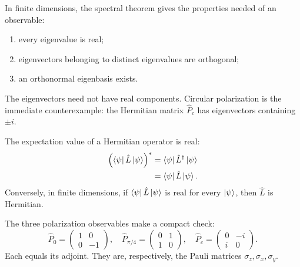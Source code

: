 In finite dimensions, the spectral theorem gives the properties needed of
an observable:
\begin{enumerate}
  \item every eigenvalue is real;
  \item eigenvectors belonging to distinct eigenvalues are orthogonal;
  \item an orthonormal eigenbasis exists.
\end{enumerate}
The eigenvectors need not have real components. Circular polarization is the
immediate counterexample: the Hermitian matrix \(\hat P_c\) has eigenvectors
containing \(\pm i\).

The expectation value of a Hermitian operator is real:
\begin{align}
  \left(
    \left\langle\psi\right\rvert\hat L\left\lvert\psi\right\rangle
  \right)^*
  &=
  \left\langle\psi\right\rvert\hat L^\dagger\left\lvert\psi\right\rangle\\
  &=
  \left\langle\psi\right\rvert\hat L\left\lvert\psi\right\rangle.
\end{align}
Conversely, in finite dimensions, if
\(\left\langle\psi\right\rvert\hat L\left\lvert\psi\right\rangle\) is real for every \(\left\lvert\psi\right\rangle\), then
\(\hat L\) is Hermitian.

\begin{classroomqa}
\end{classroomqa}

The three polarization observables make a compact check:
\begin{equation}
  \hat P_0=
  \begin{pmatrix}1&0\\0&-1\end{pmatrix},
  \quad
  \hat P_{\pi/4}=
  \begin{pmatrix}0&1\\1&0\end{pmatrix},
  \quad
  \hat P_c=
  \begin{pmatrix}0&-i\\i&0\end{pmatrix}.
  \label{eq:l7-three-Pauli}
\end{equation}
Each equals its adjoint. They are, respectively, the Pauli matrices
\(\sigma_z,\sigma_x,\sigma_y\).

